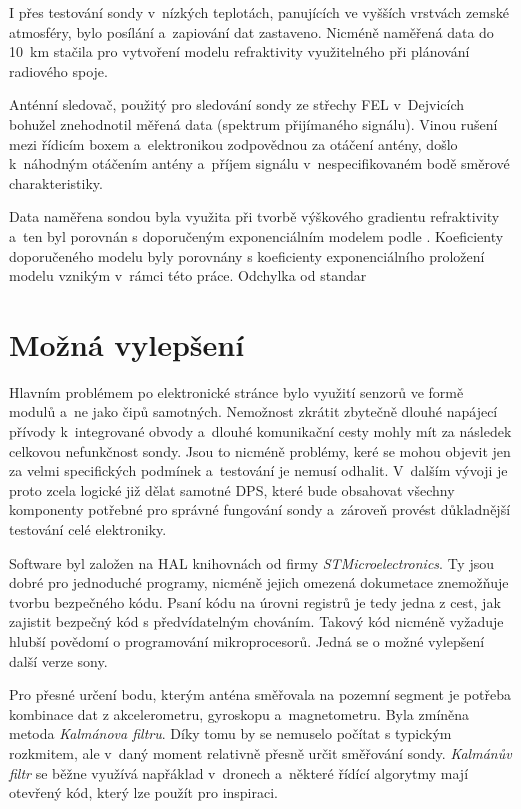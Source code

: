 \documentclass[twoside]{ctuthesis}
\theoremstyle{plain}
\theoremstyle{definition}
\theoremstyle{note}
\begin{document}
	I přes testování sondy v~nízkých teplotách, panujících ve vyšších vrstvách zemské atmosféry, bylo posílání a~zapiování dat zastaveno. Nicméně naměřená data do 10~km stačila pro vytvoření modelu refraktivity využitelného při plánování radiového spoje.

	Anténní sledovač, použitý pro sledování sondy ze střechy FEL v~Dejvicích bohužel znehodnotil měřená data (spektrum přijímaného signálu). Vinou rušení mezi řídicím boxem a~elektronikou zodpovědnou za otáčení antény, došlo k~náhodným otáčením antény a~příjem signálu v~nespecifikovaném bodě směrové charakteristiky. 

	Data naměřena sondou byla využita při tvorbě výškového gradientu refraktivity a~ten byl porovnán s doporučeným exponenciálním modelem podle \cite{ITU:refrac}. Koeficienty doporučeného modelu byly porovnány s koeficienty exponenciálního proložení modelu vznikým v~rámci této práce. Odchylka od standar



	\section{Možná vylepšení}
	Hlavním problémem po elektronické stránce bylo využití senzorů ve formě modulů a~ne jako čipů samotných. Nemožnost zkrátit zbytečně dlouhé napájecí přívody k~integrované obvody a~dlouhé komunikační cesty mohly mít za následek celkovou nefunkčnost sondy. Jsou to nicméně problémy, keré se mohou objevit jen za velmi specifických podmínek a~testování je nemusí odhalit. V~dalším vývoji je proto zcela logické již dělat samotné DPS, které bude obsahovat všechny komponenty potřebné pro správné fungování sondy a~zároveň provést důkladnější testování celé elektroniky.

	Software byl založen na HAL knihovnách od firmy \textit{STMicroelectronics}. Ty jsou dobré pro jednoduché programy, nicméně jejich omezená dokumetace znemožňuje tvorbu bezpečného kódu. Psaní kódu na úrovni registrů je tedy jedna z cest, jak zajistit bezpečný kód s předvídatelným chováním. Takový kód nicméně vyžaduje hlubší povědomí o programování mikroprocesorů. Jedná se o možné vylepšení další verze sony.

	Pro přesné určení bodu, kterým anténa směřovala na pozemní segment je potřeba kombinace dat z akcelerometru, gyroskopu a~magnetometru. Byla zmíněna metoda \textit{Kalmánova filtru}. Díky tomu by se nemuselo počítat s typickým rozkmitem, ale v~daný moment relativně přesně určit směřování sondy. \textit{Kalmánův filtr} se běžne využívá napřáklad v~dronech a~některé řídící algorytmy mají otevřený kód, který lze použít pro inspiraci.
\end{document}
